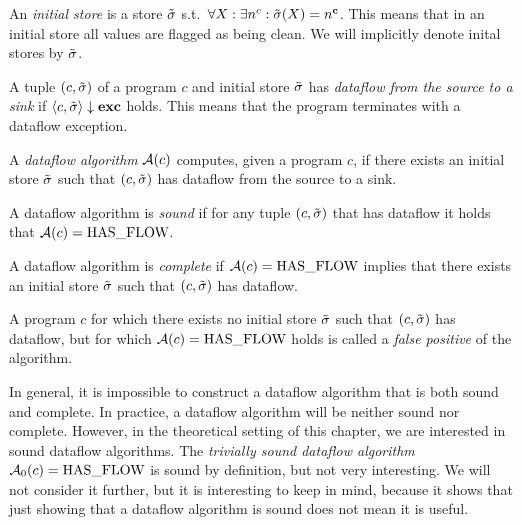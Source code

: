 \begin{definition}
    An \emph{initial store} is a store $\tilde{\sigma}$ s.t.\ 
    $\forall X: \exists n^c: \tilde{\sigma}(X) = n^\textbf{c}{}$.
    This means that in an initial store all values are flagged as being clean.
    We will implicitly denote inital stores by $\tilde{\sigma}$.
\end{definition}

\begin{definition}[Dataflow]
    A tuple $(c, \tilde{\sigma})$ of a program $c$ and initial store $\tilde{\sigma}{}$ 
    has \emph{dataflow from the source to a sink} if
    $\langle c, \tilde{\sigma}{} \rangle \downarrow \textbf{exc}$ holds.
    This means that the program terminates with a dataflow exception.
\end{definition}

\begin{definition}
    A \emph{dataflow algorithm} $\operatorname{\mathcal{A}}(c)$ computes, given a program $c$,
    if there exists an initial store $\tilde{\sigma}{}$ 
    such that $(c, \tilde{\sigma})$ has dataflow from the source to a sink.
\end{definition}

\begin{definition}[Soundness]
    A dataflow algorithm is \emph{sound} if for any tuple $(c, \tilde{\sigma})$ that
    has dataflow it holds that $\operatorname{\mathcal{A}}(c) = \text{HAS\_FLOW}$.
\end{definition}

\begin{definition}[Completeness]
    A dataflow algorithm is \emph{complete} if $\operatorname{\mathcal{A}}(c) = \text{HAS\_FLOW}$
    implies that there exists an initial store $\tilde{\sigma}$
     such that $(c, \tilde{\sigma})$ has dataflow.
\end{definition}
\begin{definition}
    A program $c$ for which there exists no initial store $\tilde{\sigma}$ such that 
    $(c, \tilde{\sigma})$ has dataflow, but for which $\operatorname{\mathcal{A}}(c) = \text{HAS\_FLOW}$ holds
    is called a \emph{false positive} of the algorithm.
\end{definition}
\begin{remark}
    In general, it is impossible to construct a dataflow algorithm that is both 
    sound and complete.
    In practice, a dataflow algorithm will be neither sound nor complete.
    However, in the theoretical setting of this chapter, we are interested in 
    sound dataflow algorithms.
    The \emph{trivially sound dataflow algorithm} $\operatorname{\mathcal{A}}_0(c) = \text{HAS\_FLOW}$ 
    is sound by definition, but not very interesting.
    We will not consider it further, but it is interesting to keep in mind,
    because it shows that just showing that a dataflow algorithm is sound does not
    mean it is useful.    
\end{remark}

